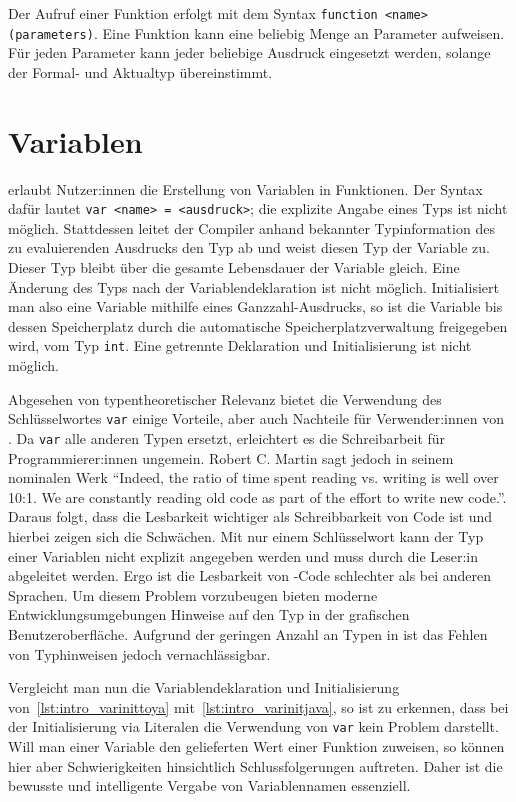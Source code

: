 Der Aufruf einer Funktion erfolgt mit dem Syntax \texttt{function <name>(parameters)}. Eine Funktion kann eine beliebig Menge an Parameter aufweisen. Für jeden Parameter kann jeder beliebige Ausdruck eingesetzt werden, solange der Formal- und Aktualtyp übereinstimmt.


\section{Variablen}
\Toya erlaubt Nutzer:innen die Erstellung von Variablen in Funktionen. Der Syntax dafür lautet \texttt{var <name> = <ausdruck>}; die explizite Angabe eines Typs ist nicht möglich. Stattdessen leitet der Compiler anhand bekannter Typinformation des zu evaluierenden Ausdrucks den Typ ab und weist diesen Typ der Variable zu. Dieser Typ bleibt über die gesamte Lebensdauer der Variable gleich. Eine Änderung des Typs nach der Variablendeklaration ist nicht möglich. Initialisiert man also eine Variable mithilfe eines Ganzzahl-Ausdrucks, so ist die Variable bis dessen Speicherplatz durch die automatische Speicherplatzverwaltung freigegeben wird, vom Typ \texttt{int}. Eine getrennte Deklaration und Initialisierung ist nicht möglich.

Abgesehen von typentheoretischer Relevanz bietet die Verwendung des Schlüsselwortes \texttt{var} einige Vorteile, aber auch Nachteile für Verwender:innen von \toya. Da \texttt{var} alle anderen Typen ersetzt, erleichtert es die Schreibarbeit für Programmierer:innen ungemein. Robert C. Martin sagt jedoch in seinem nominalen Werk \textcite{martin2009clean} ``Indeed, the ratio of time spent reading vs. writing is well over 10:1. We are constantly reading old code as part of the effort to write new code.''. Daraus folgt, dass die Lesbarkeit wichtiger als Schreibbarkeit von Code ist und hierbei zeigen sich die Schwächen. Mit nur einem Schlüsselwort kann der Typ einer Variablen nicht explizit angegeben werden und muss durch die Leser:in abgeleitet werden. Ergo ist die Lesbarkeit von \toya-Code schlechter als bei anderen Sprachen. Um diesem Problem vorzubeugen bieten moderne Entwicklungsumgebungen Hinweise auf den Typ in der grafischen Benutzeroberfläche. Aufgrund der geringen Anzahl an Typen in \toya ist das Fehlen von Typhinweisen jedoch vernachlässigbar.

Vergleicht man nun die Variablendeklaration und Initialisierung von~\autoref{lst:intro_varinittoya} mit~\autoref{lst:intro_varinitjava}, so ist zu erkennen, dass bei der Initialisierung via Literalen die Verwendung von \texttt{var} kein Problem darstellt. Will man einer Variable den gelieferten Wert einer Funktion zuweisen, so können hier aber Schwierigkeiten hinsichtlich Schlussfolgerungen auftreten. Daher ist die bewusste und intelligente Vergabe von Variablennamen essenziell.


